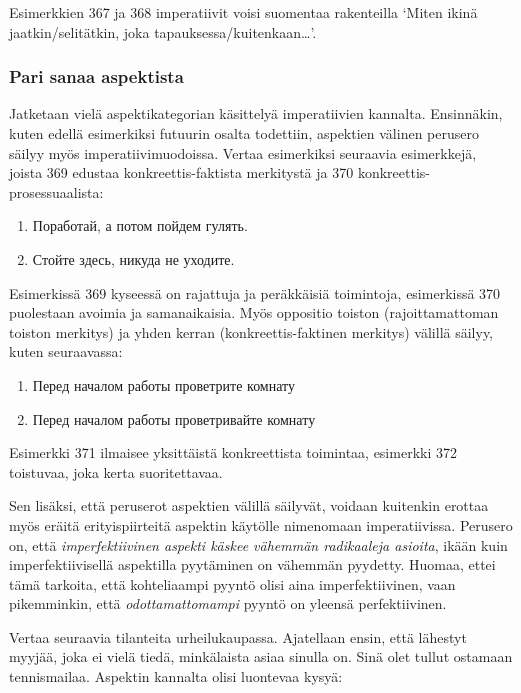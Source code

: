 \documentclass[]{scrartcl}
\providecommand{\tightlist}{%
  \setlength{\itemsep}{0pt}\setlength{\parskip}{0pt}}
\begin{document}
Esimerkkien 367 ja 368 imperatiivit voisi suomentaa rakenteilla `Miten
ikinä jaatkin/selitätkin, joka tapauksessa/kuitenkaan\ldots{}'.

\subsubsection{Pari sanaa aspektista}\label{pari-sanaa-aspektista}

Jatketaan vielä aspektikategorian käsittelyä imperatiivien kannalta.
Ensinnäkin, kuten edellä esimerkiksi futuurin osalta todettiin,
aspektien välinen perusero säilyy myös imperatiivimuodoissa. Vertaa
esimerkiksi seuraavia esimerkkejä, joista 369 edustaa
konkreettis-faktista merkitystä ja 370 konkreettis-prosessuaalista:

\begin{enumerate}
\def\labelenumi{(\arabic{enumi})}
\setcounter{enumi}{368}
\tightlist
\item
  Поработай, а потом пойдем гулять.
\item
  Стойте здесь, никуда не уходите.
\end{enumerate}

Esimerkissä 369 kyseessä on rajattuja ja peräkkäisiä toimintoja,
esimerkissä 370 puolestaan avoimia ja samanaikaisia. Myös oppositio
toiston (rajoittamattoman toiston merkitys) ja yhden kerran
(konkreettis-faktinen merkitys) välillä säilyy, kuten seuraavassa:

\begin{enumerate}
\def\labelenumi{(\arabic{enumi})}
\setcounter{enumi}{370}
\tightlist
\item
  Перед началом работы проветрите комнату
\item
  Перед началом работы проветривайте комнату
\end{enumerate}

Esimerkki 371 ilmaisee yksittäistä konkreettista toimintaa, esimerkki
372 toistuvaa, joka kerta suoritettavaa.

Sen lisäksi, että peruserot aspektien välillä säilyvät, voidaan
kuitenkin erottaa myös eräitä erityispiirteitä aspektin käytölle
nimenomaan imperatiivissa. Perusero on, että \emph{imperfektiivinen
aspekti käskee vähemmän radikaaleja asioita}, ikään kuin
imperfektiivisellä aspektilla pyytäminen on vähemmän pyydetty. Huomaa,
ettei tämä tarkoita, että kohteliaampi pyyntö olisi aina
imperfektiivinen, vaan pikemminkin, että \emph{odottamattomampi} pyyntö
on yleensä perfektiivinen.

Vertaa seuraavia tilanteita urheilukaupassa. Ajatellaan ensin, että
lähestyt myyjää, joka ei vielä tiedä, minkälaista asiaa sinulla on. Sinä
olet tullut ostamaan tennismailaa. Aspektin kannalta olisi luontevaa
kysyä:
\end{document}
